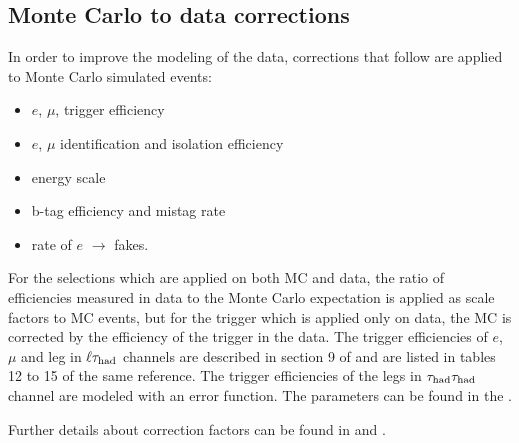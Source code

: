 \subsection{Monte Carlo to data corrections}
\label{sec:scaleFactors}
In order to improve the modeling of the data, corrections that follow are
 applied  to Monte Carlo simulated events:
\begin{itemize}
\item $e$, $\mu$, \Tau trigger efficiency
\item $e$, $\mu$ identification and isolation efficiency
\item \Tau energy scale
\item b-tag efficiency and mistag rate
\item rate of $e$ $\rightarrow$ \Tau  fakes.
\end{itemize}
For the selections which are applied on both MC and data, the ratio of efficiencies measured in data to the Monte Carlo expectation is applied as scale factors to MC events, but for the trigger which is applied only on data, the MC is corrected by the efficiency of the trigger in the data.
The trigger efficiencies of $e$, $\mu$ and \Tau leg in $\ell\tau_{\rm had}$ channels are described in section 9 of \cite{CMS_AN_2013-171}  and are listed in 
tables 12 to 15 of the same reference. The trigger efficiencies of the \Tau legs in $\tau_{\rm had}\tau_{\rm had}$ channel are modeled with an error function. 
The parameters can be found in the \cite{HiggsTauTautwiki}.
 
Further details about correction factors can be found  in   \cite{HiggsTauTautwiki} and  \cite{CMS_AN_2013-171}.


 
